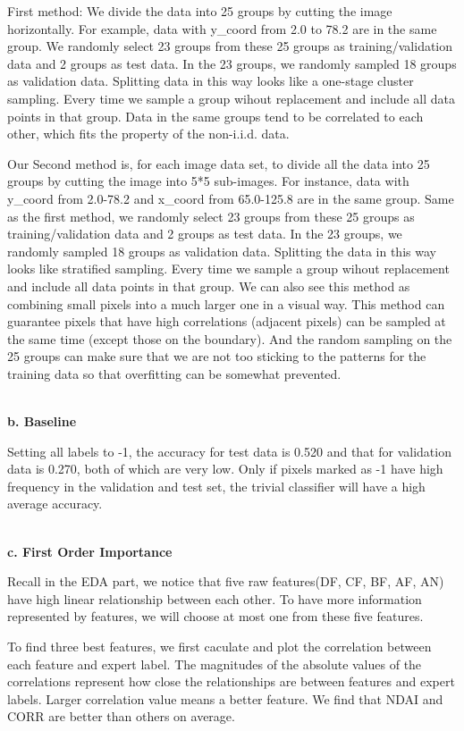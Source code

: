 \documentclass[11pt]{article}
\begin{document}
First method:
We divide the data into 25 groups by cutting the image horizontally. For example, data with y\_coord from 2.0 to 78.2 are in the same group.  We randomly select 23 groups from these 25 groups as training/validation data and 2 groups as test data. In the 23 groups, we randomly sampled 18 groups as validation data. Splitting data in this way looks like a one-stage cluster sampling. Every time we sample a group wihout replacement and include all data points in that group. Data in the same groups tend to be correlated to each other, which fits the property of the non-i.i.d. data.

Our Second method is, for each image data set, to divide all the data into 25 groups by cutting the image into 5*5 sub-images. For instance, data with y\_coord from 2.0-78.2 and x\_coord from 65.0-125.8 are in the same group. Same as the first method, we randomly select 23 groups from these 25 groups as training/validation data and 2 groups as test data. In the 23 groups, we randomly sampled 18 groups as validation data. Splitting the data in this way looks like stratified sampling. Every time we sample a group wihout replacement and include all data points in that group. We can also see this method as combining small pixels into a much larger one in a visual way. This method can guarantee pixels that have high correlations (adjacent pixels) can be sampled at the same time (except those on the boundary). And the random sampling on the 25 groups can make sure that we are not too sticking to the patterns for the training data so that overfitting can be somewhat prevented. 

\vspace{0.3cm}
\mbox{}\\
\textbf{b. Baseline}

Setting all labels to -1, the accuracy for test data is 0.520 and that for validation data is 0.270, both of which are very low. Only if pixels marked as -1 have high frequency in the validation and test set, the trivial classifier will have a high average accuracy.

\vspace{0.3cm}
\mbox{}\\
\textbf{c. First Order Importance}

Recall in the EDA part, we notice that five raw features(DF, CF, BF, AF, AN) have high linear relationship between each other. To have more information represented by features, we will choose at most one from these five features.

To find three best features, we first caculate and plot the correlation between each feature and expert label. The magnitudes of the absolute values of the correlations represent how close the relationships are between features and expert labels. Larger correlation value means a better feature. We find that NDAI and CORR are better than others on average. 
\end{document}
